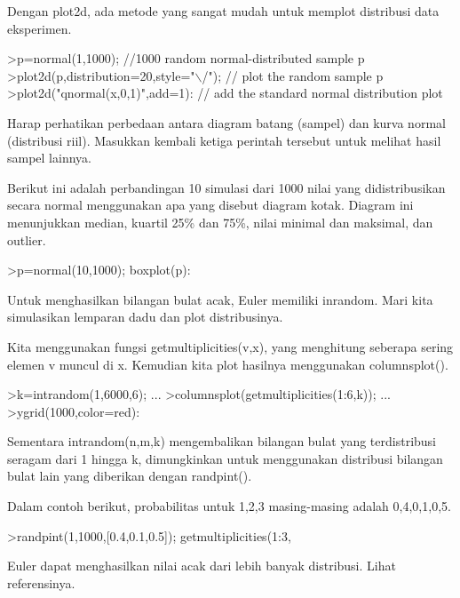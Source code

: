 \documentclass[a4paper,10pt]{article}
\begin{document}
\begin{eulernotebook}
\begin{eulercomment}
Dengan plot2d, ada metode yang sangat mudah untuk memplot distribusi
data eksperimen.
\end{eulercomment}
\begin{eulerprompt}
>p=normal(1,1000); //1000 random normal-distributed sample p
>plot2d(p,distribution=20,style="\(\backslash\)/"); // plot the random sample p
>plot2d("qnormal(x,0,1)",add=1): // add the standard normal distribution plot
\end{eulerprompt}
\begin{eulercomment}
Harap perhatikan perbedaan antara diagram batang (sampel) dan kurva
normal (distribusi riil). Masukkan kembali ketiga perintah tersebut
untuk melihat hasil sampel lainnya.
\end{eulercomment}
\begin{eulercomment}
Berikut ini adalah perbandingan 10 simulasi dari 1000 nilai yang
didistribusikan secara normal menggunakan apa yang disebut diagram
kotak. Diagram ini menunjukkan median, kuartil 25\% dan 75\%, nilai
minimal dan maksimal, dan outlier.
\end{eulercomment}
\begin{eulerprompt}
>p=normal(10,1000); boxplot(p):
\end{eulerprompt}
\begin{eulercomment}
Untuk menghasilkan bilangan bulat acak, Euler memiliki inrandom. Mari
kita simulasikan lemparan dadu dan plot distribusinya.

Kita menggunakan fungsi getmultiplicities(v,x), yang menghitung
seberapa sering elemen v muncul di x. Kemudian kita plot hasilnya
menggunakan columnsplot().
\end{eulercomment}
\begin{eulerprompt}
>k=intrandom(1,6000,6);  ...
>columnsplot(getmultiplicities(1:6,k));  ...
>ygrid(1000,color=red):
\end{eulerprompt}
\begin{eulercomment}
Sementara intrandom(n,m,k) mengembalikan bilangan bulat yang
terdistribusi seragam dari 1 hingga k, dimungkinkan untuk menggunakan
distribusi bilangan bulat lain yang diberikan dengan randpint().

Dalam contoh berikut, probabilitas untuk 1,2,3 masing-masing adalah
0,4,0,1,0,5.
\end{eulercomment}
\begin{eulerprompt}
>randpint(1,1000,[0.4,0.1,0.5]); getmultiplicities(1:3,%
\end{eulerprompt}
\begin{euleroutput}
  [381,  100,  519]
\end{euleroutput}
\begin{eulercomment}
Euler dapat menghasilkan nilai acak dari lebih banyak distribusi.
Lihat referensinya.


\end{eulercomment}
\end{eulernotebook}
\end{document}

